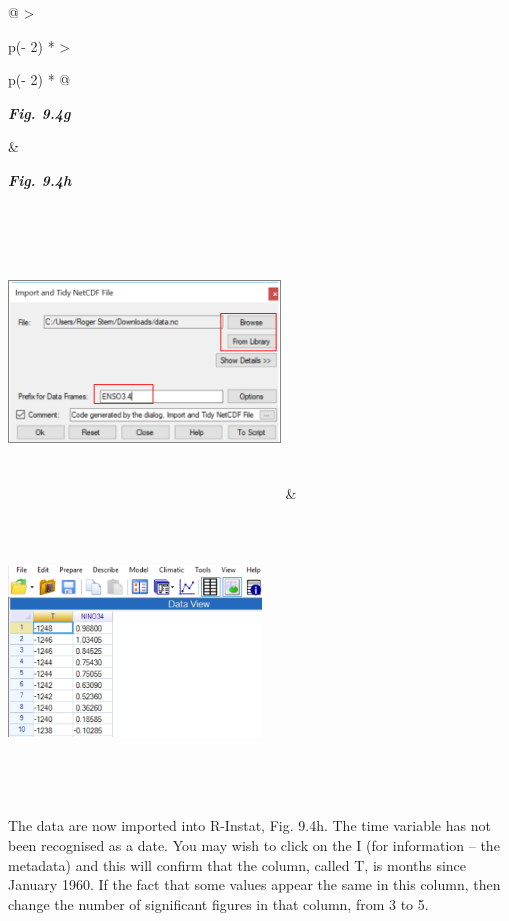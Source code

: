 \documentclass[
  letterpaper,
  DIV=11,
  numbers=noendperiod]{scrreprt}
\begin{document}
\begin{longtable}[]{@{}
  >{\raggedright\arraybackslash}p{(\columnwidth - 2\tabcolsep) * }
  >{\raggedright\arraybackslash}p{(\columnwidth - 2\tabcolsep) * }@{}}
\toprule\noalign{}
\begin{minipage}[b]{\linewidth}\raggedright
\textbf{\emph{Fig. 9.4g}}
\end{minipage} & \begin{minipage}[b]{\linewidth}\raggedright
\textbf{\emph{Fig. 9.4h}}
\end{minipage} \\
\midrule\noalign{}
\endhead
\bottomrule\noalign{}
\endlastfoot
\includegraphics[width=2.84199in,height=2.86736in]{figures/Fig9.4g.png}
&
\includegraphics[width=2.64771in,height=3.06124in]{figures/Fig9.4h.png} \\
\end{longtable}

The data are now imported into R-Instat, Fig. 9.4h. The time variable
has not been recognised as a date. You may wish to click on the I (for
information -- the metadata) and this will confirm that the column,
called T, is months since January 1960. If the fact that some values
appear the same in this column, then change the number of significant
figures in that column, from 3 to 5.
\end{document}

